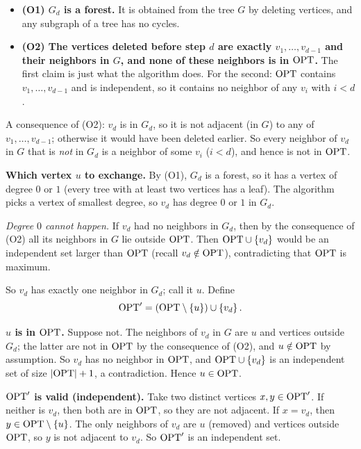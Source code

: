 \documentclass[11pt,addpoints,answers]{exam}
\begin{document}
\begin{questions}
\begin{parts}
\begin{solution}
      \begin{itemize}
        \item \textbf{(O1) $G_d$ is a forest.} It is obtained from the tree $G$ by deleting vertices, and any subgraph of a tree has no cycles.
        \item \textbf{(O2) The vertices deleted before step $d$ are exactly $v_1,\dots,v_{d-1}$ and their neighbors in $G$, and none of these neighbors is in $\mathrm{OPT}$.}
        The first claim is just what the algorithm does.
        For the second: $\mathrm{OPT}$ contains $v_1,\dots,v_{d-1}$ and is independent, so it contains no neighbor of any $v_i$ with $i<d$.
      \end{itemize}
      A consequence of (O2): $v_d$ is in $G_d$, so it is not adjacent (in $G$) to any of $v_1,\dots,v_{d-1}$; otherwise it would have been deleted earlier.
      So every neighbor of $v_d$ in $G$ that is \emph{not} in $G_d$ is a neighbor of some $v_i$ ($i<d$), and hence is not in $\mathrm{OPT}$.

      \textbf{Which vertex $u$ to exchange.}
      By (O1), $G_d$ is a forest, so it has a vertex of degree $0$ or $1$ (every tree with at least two vertices has a leaf).
      The algorithm picks a vertex of smallest degree, so $v_d$ has degree $0$ or $1$ in $G_d$.

      \emph{Degree $0$ cannot happen.}
      If $v_d$ had no neighbors in $G_d$, then by the consequence of (O2) all its neighbors in $G$ lie outside $\mathrm{OPT}$.
      Then $\mathrm{OPT} \cup \left\{v_d\right\}$ would be an independent set larger than $\mathrm{OPT}$ (recall $v_d \notin \mathrm{OPT}$), contradicting that $\mathrm{OPT}$ is maximum.

      So $v_d$ has exactly one neighbor in $G_d$; call it $u$.
      Define
      \[
        \mathrm{OPT}' = (\mathrm{OPT} \setminus \left\{u\right\}) \cup \left\{v_d\right\}.
      \]

      \textbf{$u$ is in $\mathrm{OPT}$.}
      Suppose not.
      The neighbors of $v_d$ in $G$ are $u$ and vertices outside $G_d$; the latter are not in $\mathrm{OPT}$ by the consequence of (O2), and $u \notin \mathrm{OPT}$ by assumption.
      So $v_d$ has no neighbor in $\mathrm{OPT}$, and $\mathrm{OPT} \cup \left\{v_d\right\}$ is an independent set of size $\left|\mathrm{OPT}\right|+1$, a contradiction.
      Hence $u \in \mathrm{OPT}$.

      \textbf{$\mathrm{OPT}'$ is valid (independent).}
      Take two distinct vertices $x,y \in \mathrm{OPT}'$.
      If neither is $v_d$, then both are in $\mathrm{OPT}$, so they are not adjacent.
      If $x = v_d$, then $y \in \mathrm{OPT} \setminus \left\{u\right\}$.
      The only neighbors of $v_d$ are $u$ (removed) and vertices outside $\mathrm{OPT}$, so $y$ is not adjacent to $v_d$.
      So $\mathrm{OPT}'$ is an independent set.


\end{solution}
\end{parts}
\end{questions}
\end{document}
